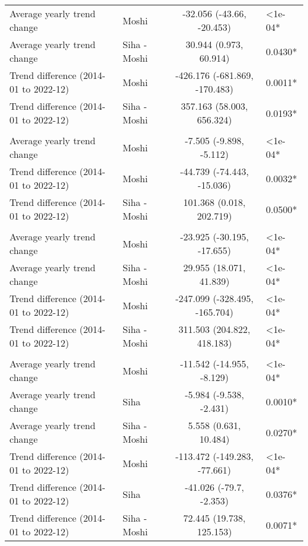 \begin{longtable}{l|lcl}
\midrule\addlinespace[2.5pt]
\multicolumn{4}{l}{Caries} \\ 
\midrule\addlinespace[2.5pt]
Average yearly trend change & Moshi & -32.056 (-43.66, -20.453) & <1e-04* \\ 
Average yearly trend change & Siha - Moshi & 30.944 (0.973, 60.914) & 0.0430* \\ 
Trend difference (2014-01 to 2022-12) & Moshi & -426.176 (-681.869, -170.483) & 0.0011* \\ 
Trend difference (2014-01 to 2022-12) & Siha - Moshi & 357.163 (58.003, 656.324) & 0.0193* \\ 
\midrule\addlinespace[2.5pt]
\multicolumn{4}{l}{Dysentery} \\ 
\midrule\addlinespace[2.5pt]
Average yearly trend change & Moshi & -7.505 (-9.898, -5.112) & <1e-04* \\ 
Trend difference (2014-01 to 2022-12) & Moshi & -44.739 (-74.443, -15.036) & 0.0032* \\ 
Trend difference (2014-01 to 2022-12) & Siha - Moshi & 101.368 (0.018, 202.719) & 0.0500* \\ 
\midrule\addlinespace[2.5pt]
\multicolumn{4}{l}{Skin Infection - Fungal} \\ 
\midrule\addlinespace[2.5pt]
Average yearly trend change & Moshi & -23.925 (-30.195, -17.655) & <1e-04* \\ 
Average yearly trend change & Siha - Moshi & 29.955 (18.071, 41.839) & <1e-04* \\ 
Trend difference (2014-01 to 2022-12) & Moshi & -247.099 (-328.495, -165.704) & <1e-04* \\ 
Trend difference (2014-01 to 2022-12) & Siha - Moshi & 311.503 (204.822, 418.183) & <1e-04* \\ 
\midrule\addlinespace[2.5pt]
\multicolumn{4}{l}{Malnutrition} \\ 
\midrule\addlinespace[2.5pt]
Average yearly trend change & Moshi & -11.542 (-14.955, -8.129) & <1e-04* \\ 
Average yearly trend change & Siha & -5.984 (-9.538, -2.431) & 0.0010* \\ 
Average yearly trend change & Siha - Moshi & 5.558 (0.631, 10.484) & 0.0270* \\ 
Trend difference (2014-01 to 2022-12) & Moshi & -113.472 (-149.283, -77.661) & <1e-04* \\ 
Trend difference (2014-01 to 2022-12) & Siha & -41.026 (-79.7, -2.353) & 0.0376* \\ 
Trend difference (2014-01 to 2022-12) & Siha - Moshi & 72.445 (19.738, 125.153) & 0.0071* \\ 

\end{longtable}
